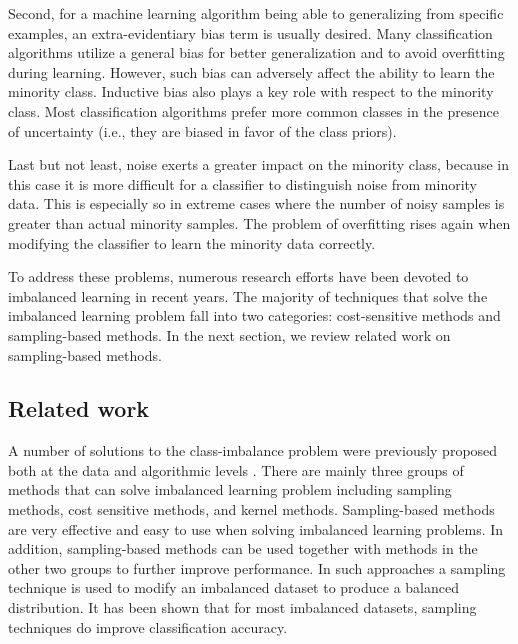 \documentclass[10pt,journal,compsoc]{IEEEtran}
\begin{document}
Second, for a machine learning algorithm being able to generalizing from specific examples, an extra-evidentiary bias term is usually desired. Many classification algorithms utilize a general bias for better generalization and to avoid overfitting during learning. However, such bias can adversely affect the ability to learn the minority class. Inductive bias also plays a key role with respect to the minority class. Most classification algorithms prefer more common classes in the presence of uncertainty (i.e., they are biased in favor of the class priors).

Last but not least, noise exerts a greater impact on the minority class, because in this case it is more difficult for a classifier to distinguish noise from minority data. This is especially so in extreme cases where the number of noisy samples is greater than actual minority samples. The problem of overfitting rises again when modifying the classifier to learn the minority data correctly.

To address these problems, numerous research efforts have been devoted to imbalanced learning in recent years. The majority of techniques that solve the imbalanced learning problem fall into two categories: cost-sensitive methods and sampling-based methods. In the next section, we review related work on sampling-based methods.

\subsection{Related work}

A number of solutions to the class-imbalance problem were previously proposed both at the data and algorithmic levels \cite{chawla2004editorial}. There
are mainly three groups of methods that can solve imbalanced learning problem \cite{HH:09} including sampling methods, cost sensitive methods, and kernel methods. Sampling-based methods are very effective and easy to use when solving imbalanced learning problems. In addition, sampling-based methods can be used together with methods in the other two groups to further improve performance. In such approaches a sampling technique is used to modify an imbalanced dataset to produce a balanced distribution. It has been shown that for most imbalanced datasets, sampling techniques do improve classification accuracy.
\end{document}
